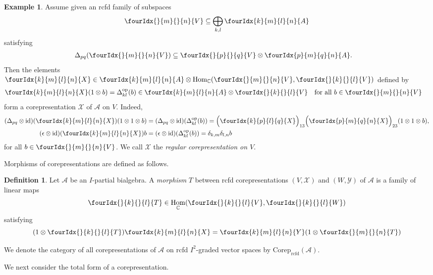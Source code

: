 \documentclass[10pt]{article}
\DeclareMathOperator{\id}{id}
\DeclareMathOperator{\Hom}{Hom}
\DeclareMathOperator{\op}{\mathrm{op}}
\DeclareMathOperator{\rcf}{\mathrm{rcfd}}
\newcommand{\Corep}{\mathrm{Corep}}
\newcommand{\C}{\mathbb{C}}
\newcommand{\Gr}[5]{\fourIdx{#2}{#4}{#3}{#5}{#1}}%
\newcommand{\Gru}[3]{\Gr{#1}{}{}{#2}{#3}}
\theoremstyle{definition}
\newtheorem{Def}[Theorem]{Definition}
\newtheorem{Exa}[Theorem]{Example}
\numberwithin{equation}{section}
\begin{document}
\begin{Exa} \label{example:rep-regular}
  Assume  given an rcfd family of subspaces
  \begin{align*}
    \Gru{V}{m}{n} \subseteq \bigoplus_{k,l} \Gr{A}{k}{l}{m}{n}
  \end{align*}
  satisfying
  \begin{align} \label{eq:rep-regular-inclusion}
    \Delta_{pq}(\Gru{V}{m}{n}) &\subseteq \Gru{V}{p}{q} \otimes
    \Gr{A}{p}{q}{m}{n}.
  \end{align}
Then the  elements $\Gr{X}{k}{l}{m}{n} \in \Gr{A}{k}{l}{m}{n} \otimes
  \Hom_{\C}(\Gru{V}{m}{n},\Gru{V}{k}{l})$ defined by 
  \begin{align*}
    \Gr{X}{k}{l}{m}{n}(1 \otimes b) &= \Delta^{\op}_{kl}(b) \in
    \Gr{A}{k}{l}{m}{n} \otimes \Gru{V}{k}{l} \quad
    \text{for all } b\in \Gru{V}{m}{n}
  \end{align*}
  form a corepresentation $\mathscr{X}$ of $\mathscr{A}$ on
  $V$. Indeed, 
  \begin{align*}
    (\Delta_{pq} \otimes \id)(\Gr{X}{k}{l}{m}{n})(1 \otimes 1 \otimes
    b) &=(\Delta_{pq}\otimes \id)(\Delta^{\op}_{kl}(b)) =
    \Big{(}\Gr{X}{k}{l}{p}{q}\Big{)}_{13}\Big{(}\Gr{X}{p}{q}{m}{n}\Big{)}_{23}(1
    \otimes 1 \otimes b), \\
    (\epsilon \otimes \id)(\Gr{X}{k}{l}{m}{n})b &= (\epsilon \otimes
    \id)(\Delta^{\op}_{kl}(b)) = \delta_{k,m}\delta_{l,n}b
  \end{align*}
  for all $b\in \Gru{V}{m}{n}$.  We call $\mathscr{X}$ the
  \emph{regular corepresentation on $V$}. 
\end{Exa}


Morphisms of corepresentations are defined as follows.
\begin{Def}
  Let $\mathscr{A}$ be an $I$-partial bialgebra.  A \emph{morphism}
  $T$ between rcfd corepresentations
  $(V,\mathscr{X})$ and $(W,\mathscr{Y})$ of $\mathscr{A}$ is a family
  of linear maps
  \[\Gru{T}{k}{l} \in
  \Hom_\C(\Gru{V}{k}{l},\Gru{W}{k}{l})\] satisfying \[(1 \otimes
  \Gru{T}{k}{l})\Gr{X}{k}{l}{m}{n} = \Gr{Y}{k}{l}{m}{n}(1 \otimes
  \Gru{T}{m}{n})\]
\end{Def}

We denote the category of all corepresentations of $\mathscr{A}$ on rcfd $I^2$-graded vector spaces by $\Corep_{\rcf}(\mathscr{A})$.

We next consider the total form of a corepresentation.
\end{document}
